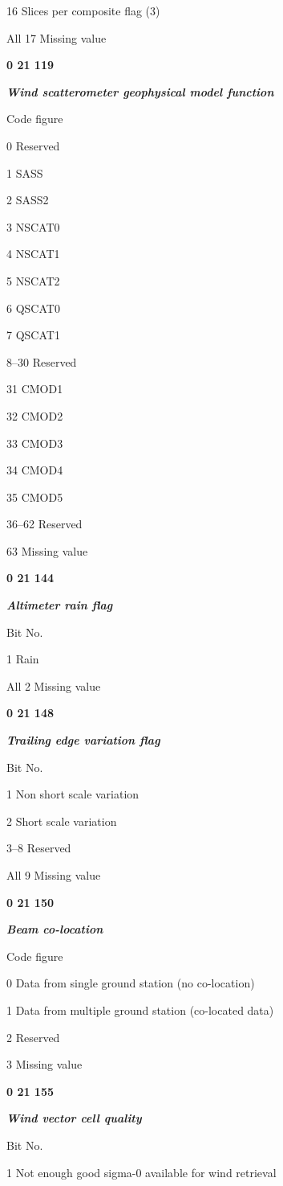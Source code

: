 16 Slices per composite flag (3)

All 17 Missing value

\textbf{0 21 119}

\emph{\textbf{Wind scatterometer geophysical model function}}

Code figure

0 Reserved

1 SASS

2 SASS2

3 NSCAT0

4 NSCAT1

5 NSCAT2

6 QSCAT0

7 QSCAT1

8--30 Reserved

31 CMOD1

32 CMOD2

33 CMOD3

34 CMOD4

35 CMOD5

36--62 Reserved

63 Missing value

\textbf{0 21 144}

\emph{\textbf{Altimeter rain flag}}

Bit No.

1 Rain

All 2 Missing value

\textbf{0 21 148}

\emph{\textbf{Trailing edge variation flag}}

Bit No.

1 Non short scale variation

2 Short scale variation

3--8 Reserved

All 9 Missing value

\textbf{0 21 150}

\emph{\textbf{Beam co-location}}

Code figure

0 Data from single ground station (no co-location)

1 Data from multiple ground station (co-located data)

2 Reserved

3 Missing value

\textbf{0 21 155}

\emph{\textbf{Wind vector cell quality}}

Bit No.

1 Not enough good sigma-0 available for wind retrieval

